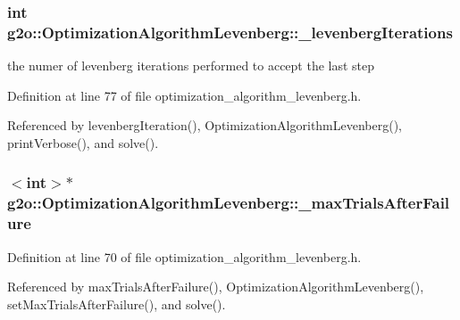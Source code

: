 \subsubsection[{\texorpdfstring{\+\_\+levenberg\+Iterations}{_levenbergIterations}}]{\setlength{\rightskip}{0pt plus 5cm}int g2o\+::\+Optimization\+Algorithm\+Levenberg\+::\+\_\+levenberg\+Iterations\hspace{0.3cm}{\ttfamily [protected]}}\hypertarget{classg2o_1_1OptimizationAlgorithmLevenberg_a2319771c8d3ee0f773bdb86d5416bab7}{}\label{classg2o_1_1OptimizationAlgorithmLevenberg_a2319771c8d3ee0f773bdb86d5416bab7}


the numer of levenberg iterations performed to accept the last step 



Definition at line 77 of file optimization\+\_\+algorithm\+\_\+levenberg.\+h.



Referenced by levenberg\+Iteration(), Optimization\+Algorithm\+Levenberg(), print\+Verbose(), and solve().

\subsubsection[{\texorpdfstring{\+\_\+max\+Trials\+After\+Failure}{_maxTrialsAfterFailure}}]{$<$int$>$$\ast$ g2o\+::\+Optimization\+Algorithm\+Levenberg\+::\+\_\+max\+Trials\+After\+Failure\hspace{0.3cm}{\ttfamily [protected]}}\hypertarget{classg2o_1_1OptimizationAlgorithmLevenberg_a1f3b03bbcb2dbeed686069bed8783b80}{}\label{classg2o_1_1OptimizationAlgorithmLevenberg_a1f3b03bbcb2dbeed686069bed8783b80}


Definition at line 70 of file optimization\+\_\+algorithm\+\_\+levenberg.\+h.



Referenced by max\+Trials\+After\+Failure(), Optimization\+Algorithm\+Levenberg(), set\+Max\+Trials\+After\+Failure(), and solve().

